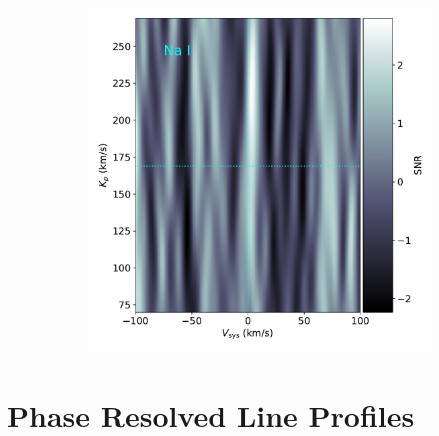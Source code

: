 \documentclass[twocolumn]{aastex631}
\begin{document}
\begin{figure}[ht!]
\begin{subfigure}[b]{0.3\textwidth}
                \end{subfigure}
                \begin{subfigure}[b]{0.3\textwidth}
                    \centering
                    \includegraphics[width=\textwidth]{plots-updated/kp-vsys-map/combined/KELT-20b.20190504.combined.Na.CCFs-shifted.pdf}
                \end{subfigure}
                \caption{}
            \end{figure}

        \section{Phase Resolved Line Profiles}
        
        
\end{document}
